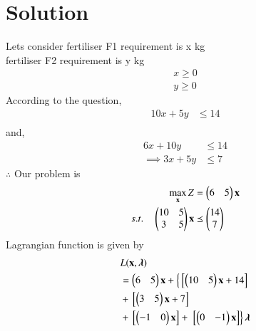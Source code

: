\documentclass[journal,12pt,twocolumn]{IEEEtran}
\begin{document}
\section{Solution}
\begin{table}[!ht]
\centering
{}
\label{opt/16/tab:table1}
\end{table}
\item Lets consider fertiliser F1 requirement is x kg \\
fertiliser F2 requirement is y kg 
\begin{align}
    x \geq 0 \\
    y \geq 0 
\end{align}
According to the question,
\begin{align}
    10x+5y &\leq 14 \\
\end{align}
     and,
\begin{align}
    6x+10y &\leq 14 \\
 \implies 3x+5y &\leq 7
\end{align}
$\therefore$ Our problem is
\begin{align}
        \max_{\mathbf{x}} Z &= \begin{pmatrix}6 & 5\end{pmatrix}\mathbf{x}\\
        s.t. \quad 
        \begin{pmatrix}10 & 5 \\ 3 & 5 \end{pmatrix}\mathbf{x} &\preceq \begin{pmatrix}14\\7\end{pmatrix} 
\end{align}
Lagrangian function is given by
\begin{equation}
\begin{aligned}
    &L(\mathbf{x},\boldsymbol{\lambda}) \\ &= \begin{pmatrix}6 & 5\end{pmatrix}\mathbf{x}+\left\{{}\left[\begin{pmatrix}10 & 5\end{pmatrix}\mathbf{x}+14\right]\right. \\ &+ {}\left[\begin{pmatrix}3 & 5\end{pmatrix}\mathbf{x}+7\right] \\ &+ {}\left[\begin{pmatrix}-1 & 0\end{pmatrix}\mathbf{x}\right] +\left.{}\left[\begin{pmatrix}0 & -1\end{pmatrix}\mathbf{x}\right]\right\}\boldsymbol{\lambda}
\end{aligned}
\end{equation}
\end{document}
